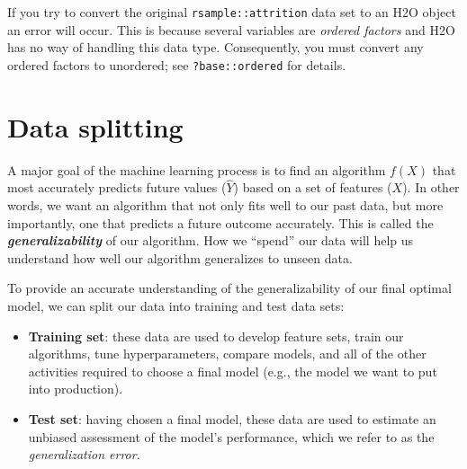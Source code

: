 \documentclass[]{krantz}
\makeatletter
\newenvironment{Shaded}{\begin{snugshade}}{\end{snugshade}}
\newcommand{\CommentTok}[1]{\textcolor[rgb]{0.37,0.37,0.37}{\textit{#1}}}
\newcommand{\DataTypeTok}[1]{\textcolor[rgb]{0.27,0.27,0.27}{#1}}
\newcommand{\KeywordTok}[1]{\textcolor[rgb]{0.27,0.27,0.27}{\textbf{#1}}}
\newcommand{\NormalTok}[1]{#1}
\newcommand{\OperatorTok}[1]{\textcolor[rgb]{0.43,0.43,0.43}{\textbf{#1}}}
\newcommand{\OtherTok}[1]{\textcolor[rgb]{0.37,0.37,0.37}{#1}}
\newcommand{\StringTok}[1]{\textcolor[rgb]{0.5,0.5,0.5}{#1}}
\providecommand{\tightlist}{%
  \setlength{\itemsep}{0pt}\setlength{\parskip}{0pt}}
\newenvironment{kframe}{%
\medskip{}
\setlength{\fboxsep}{.8em}
 \def\at@end@of@kframe{}%
 \ifinner\ifhmode%
  \def\at@end@of@kframe{\end{minipage}}%
  \begin{minipage}{\columnwidth}%
 \fi\fi%
 \def\FrameCommand##1{\hskip\@totalleftmargin \hskip-\fboxsep
 \colorbox{shadecolor}{##1}\hskip-\fboxsep
     \hskip-\linewidth \hskip-\@totalleftmargin \hskip\columnwidth}%
 \MakeFramed {\advance\hsize-\width
   \@totalleftmargin\z@ \linewidth\hsize
   \@setminipage}}%
 {\par\unskip\endMakeFramed%
 \at@end@of@kframe}
\newenvironment{block}[1]
  {
  \begin{itemize}
  \renewcommand{\labelitemi}{
    \raisebox{-.7\height}[0pt][0pt]{
      {\setkeys{Gin}{width=3em,keepaspectratio}\texttt{[image: icons/\#1]}}
    }
  }
  \setlength{\fboxsep}{1em}
  \begin{kframe}
  \item
  }
  {
  \end{kframe}
  \end{itemize}
  }
\newenvironment{warning}
  {\begin{block}{warning}}
  {\end{block}}
\renewenvironment{Shaded}{\begin{kframe}}{\end{kframe}}
\makeatother
\begin{document}
\begin{warning}
If you try to convert the original \texttt{rsample::attrition} data set
to an H2O object an error will occur. This is because several variables
are \emph{ordered factors} and H2O has no way of handling this data
type. Consequently, you must convert any ordered factors to unordered;
see \texttt{?base::ordered} for details.
\end{warning}

\begin{Shaded}
\end{Shaded}

\hypertarget{splitting}{%
\section{Data splitting}\label{splitting}}

A major goal of the machine learning process is to find an algorithm \(f\left(X\right)\) that most accurately predicts future values (\(\hat{Y}\)) based on a set of features (\(X\)). In other words, we want an algorithm that not only fits well to our past data, but more importantly, one that predicts a future outcome accurately. This is called the \textbf{\emph{generalizability}} of our algorithm. How we ``spend'' our data will help us understand how well our algorithm generalizes to unseen data.

To provide an accurate understanding of the generalizability of our final optimal model, we can split our data into training and test data sets:

\begin{itemize}
\tightlist
\item
  \textbf{Training set}: these data are used to develop feature sets, train our algorithms, tune hyperparameters, compare models, and all of the other activities required to choose a final model (e.g., the model we want to put into production).
\item
  \textbf{Test set}: having chosen a final model, these data are used to estimate an unbiased assessment of the model's performance, which we refer to as the \emph{generalization error}.
\end{itemize}
\end{document}
